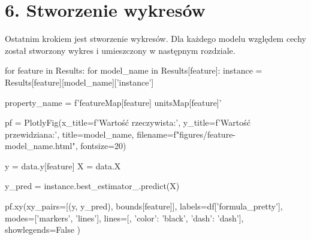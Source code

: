 {}
\justify
\fontsize{14}{16}\selectfont
\setlength{\parindent}{0pt}
\section*{6. Stworzenie wykresów} 
\fontsize{12}{14}\selectfont

\hspace{1.5cm} Ostatnim krokiem jest stworzenie wykresów. 
Dla każdego modelu względem cechy został stworzony wykres i umieszczony w następnym rozdziale.

\begin{pythoncode}
for feature in Results:
    for model_name in Results[feature]:
        instance = Results[feature][model_name]['instance']

        property_name = f'{featureMap[feature]} {unitsMap[feature]}'

        pf = PlotlyFig(x_title=f'Wartość rzeczywista:',
                       y_title=f'Wartość przewidziana:',
                       title=model_name,
                       filename=f"figures/{feature}-{model_name}.html",
                       fontsize=20)

        y = data.y[feature]
        X = data.X

        y_pred = instance.best_estimator_.predict(X)

        pf.xy(xy_pairs=[(y, y_pred), bounds[feature]],
              labels=df['formula_pretty'],
              modes=['markers', 'lines'],
              lines=[{}, {'color': 'black', 'dash': 'dash'}],
              showlegends=False
              )
\end{pythoncode}